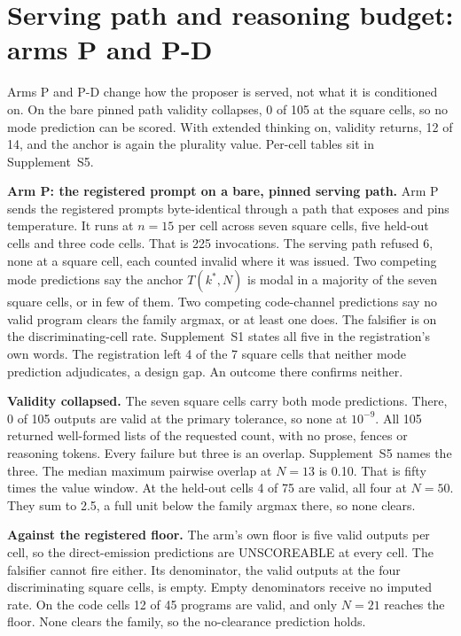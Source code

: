 \section{Serving path and reasoning budget: arms P and P-D}\label{sec:arm-p}

Arms P and P-D change how the proposer is served, not what it is conditioned on. On the bare
pinned path validity collapses, 0 of 105 at the square cells, so no mode prediction can be
scored. With extended thinking on, validity returns, 12 of 14, and the anchor is again the
plurality value. Per-cell tables sit in Supplement~S5.

\textbf{Arm P: the registered prompt on a bare, pinned serving path.} Arm P sends the
registered prompts byte-identical through a path that exposes and pins temperature. It
runs at $n = 15$ per cell across seven square cells, five held-out cells and three code cells. That
is 225 invocations. The serving path refused 6, none at a square cell, each counted invalid
where it was issued. Two competing mode predictions say the anchor $T(k^*, N)$ is modal in a
majority of the seven square cells, or in few of them. Two competing code-channel predictions
say no valid program clears the family argmax, or at least one does. The falsifier is on the
discriminating-cell rate. Supplement~S1 states all five in the registration's own words.
The registration left 4 of the 7 square cells that neither mode prediction adjudicates, a
design gap. An outcome there confirms neither.

\textbf{Validity collapsed.} The seven square cells carry both mode predictions. There, 0 of
105 outputs are valid at the primary tolerance, so none at $10^{-9}$. All 105 returned well-formed lists of the requested
count, with no prose, fences or reasoning tokens. Every failure but three is an
overlap. Supplement~S5 names the three. The median maximum pairwise overlap at $N = 13$ is
0.10. That is fifty times the value window. At the held-out cells 4 of 75 are valid, all four
at $N = 50$. They sum to 2.5, a full unit below the family argmax there, so none clears.

\textbf{Against the registered floor.} The arm's own floor is five valid outputs per cell, so
the direct-emission predictions are UNSCOREABLE at every cell. The falsifier cannot fire either. Its
denominator, the valid outputs at the four discriminating square cells, is
empty. Empty denominators receive no imputed rate. On the
code cells 12 of 45 programs are valid, and only $N = 21$ reaches the floor. None clears the
family, so the no-clearance prediction holds.

